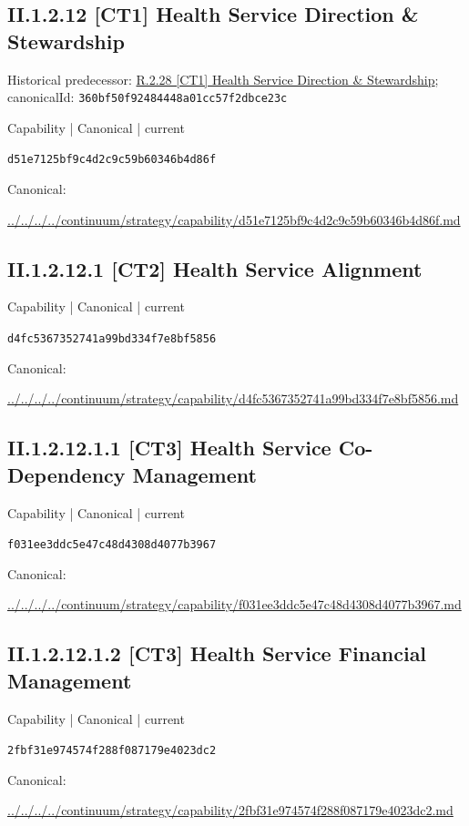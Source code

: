 \documentclass[10pt,a4paper]{article}
\begin{document}
\subsection*{II.1.2.12 [CT1] Health Service Direction \& Stewardship}
Historical predecessor: \hyperref[element-360bf50f92484448a01cc57f2dbce23c]{R.2.28 [CT1] Health Service Direction \& Stewardship}; canonicalId: \texttt{360bf50f92484448a01cc57f2dbce23c}\par
\label{element-d51e7125bf9c4d2c9c59b60346b4d86f}
{\small Capability | Canonical | current}\par
\texttt{d51e7125bf9c4d2c9c59b60346b4d86f}\par
Canonical: \par
{\footnotesize\url{../../../../continuum/strategy/capability/d51e7125bf9c4d2c9c59b60346b4d86f.md}}\par
\subsection*{II.1.2.12.1 [CT2] Health Service Alignment}
\label{element-d4fc5367352741a99bd334f7e8bf5856}
{\small Capability | Canonical | current}\par
\texttt{d4fc5367352741a99bd334f7e8bf5856}\par
Canonical: \par
{\footnotesize\url{../../../../continuum/strategy/capability/d4fc5367352741a99bd334f7e8bf5856.md}}\par
\subsection*{II.1.2.12.1.1 [CT3] Health Service Co-Dependency Management}
\label{element-f031ee3ddc5e47c48d4308d4077b3967}
{\small Capability | Canonical | current}\par
\texttt{f031ee3ddc5e47c48d4308d4077b3967}\par
Canonical: \par
{\footnotesize\url{../../../../continuum/strategy/capability/f031ee3ddc5e47c48d4308d4077b3967.md}}\par
\subsection*{II.1.2.12.1.2 [CT3] Health Service Financial Management}
\label{element-2fbf31e974574f288f087179e4023dc2}
{\small Capability | Canonical | current}\par
\texttt{2fbf31e974574f288f087179e4023dc2}\par
Canonical: \par
{\footnotesize\url{../../../../continuum/strategy/capability/2fbf31e974574f288f087179e4023dc2.md}}\par
\end{document}
